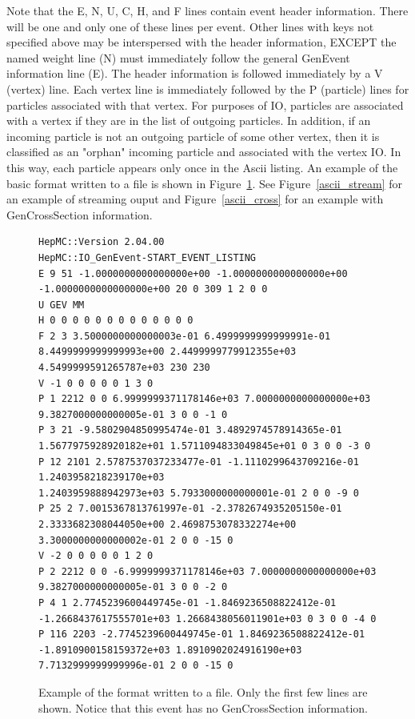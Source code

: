 \documentclass[11pt,letterpaper]{article}
\begin{document}
Note that the E, N, U, C, H, and F lines contain event header information.
There will be one and only one of these lines per event.
Other lines with keys not specified above may be interspersed with the header 
information, EXCEPT the named weight line (N) must immediately follow the 
general GenEvent information line (E).
The header information is followed immediately by a V (vertex) line.
Each vertex line is immediately followed by the P (particle) lines 
for particles associated with that vertex.  
For purposes of IO, particles are associated with a vertex if they
are in the list of outgoing particles.
In addition, if an incoming particle is not an outgoing particle of 
some other vertex, then it is classified as an "orphan" incoming particle
and associated with the vertex IO.
In this way, each particle appears only once in the Ascii listing.
An example of the basic format written to a file is shown in Figure~\ref{ascii_format}.
See Figure~\ref{ascii_stream} for an example of streaming ouput and 
Figure~\ref{ascii_cross} for an example with GenCrossSection information.

\begin{figure}[h]
  \begin{center}
{\tiny \begin{verbatim}
HepMC::Version 2.04.00 
HepMC::IO_GenEvent-START_EVENT_LISTING 
E 9 51 -1.0000000000000000e+00 -1.0000000000000000e+00 -1.0000000000000000e+00 20 0 309 1 2 0 0
U GEV MM 
H 0 0 0 0 0 0 0 0 0 0 0 0 0 
F 2 3 3.5000000000000003e-01 6.4999999999999991e-01 8.4499999999999993e+00 2.4499999779912355e+03 4.5499999591265787e+03 230 230
V -1 0 0 0 0 0 1 3 0 
P 1 2212 0 0 6.9999999371178146e+03 7.0000000000000000e+03 9.3827000000000005e-01 3 0 0 -1 0
P 3 21 -9.5802904850995474e-01 3.4892974578914365e-01 1.5677975928920182e+01 1.5711094833049845e+01 0 3 0 0 -3 0
P 12 2101 2.5787537037233477e-01 -1.1110299643709216e-01 1.2403958218239170e+03
1.2403959888942973e+03 5.7933000000000001e-01 2 0 0 -9 0
P 25 2 7.0015367813761997e-01 -2.3782674935205150e-01 2.3333682308044050e+00 2.4698753078332274e+00 3.3000000000000002e-01 2 0 0 -15 0
V -2 0 0 0 0 0 1 2 0 
P 2 2212 0 0 -6.9999999371178146e+03 7.0000000000000000e+03 9.3827000000000005e-01 3 0 0 -2 0
P 4 1 2.7745239600449745e-01 -1.8469236508822412e-01 -1.2668437617555701e+03 1.2668438056011901e+03 0 3 0 0 -4 0
P 116 2203 -2.7745239600449745e-01 1.8469236508822412e-01 -1.8910900158159372e+03 1.8910902024916190e+03 7.7132999999999996e-01 2 0 0 -15 0
\end{verbatim}}
  \end{center}
  \caption[Example of ascii format]
          {\label{ascii_format} Example of the format written to a file.  
           Only the first few lines are shown. 
	   Notice that this event has no GenCrossSection information. }
\end{figure}
\end{document}
